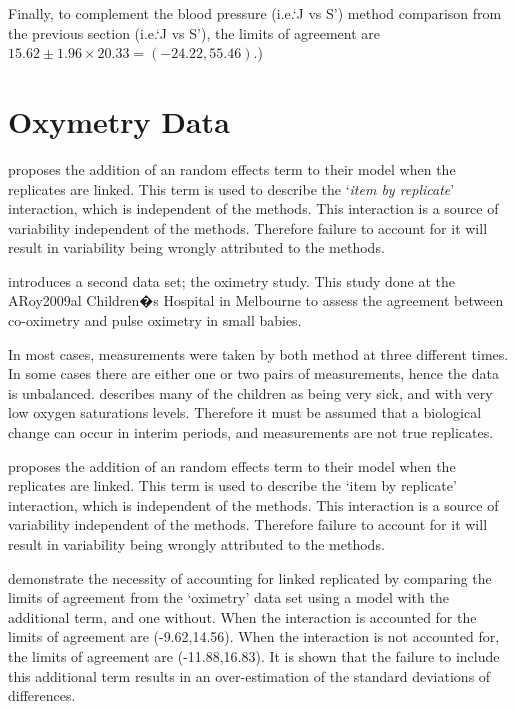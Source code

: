 \documentclass[12pt, a4paper]{report}
\theoremstyle{plain}
\theoremstyle{definition}
\theoremstyle{remark}
\begin{document}
	

	

	
	
	



	
	Finally, to complement the blood pressure (i.e.`J vs S') method comparison from the previous section (i.e.`J vs S'), the limits of agreement are $15.62 \pm 1.96 \times 20.33 = (-24.22, 55.46)$.)
	\newpage	

	\section{Oxymetry Data}
	\citet{BXC2008} proposes the addition of an random effects term to their model when the replicates are linked. This term is used to describe the `\textit{item by replicate}' interaction, which is independent of the methods. This interaction is a source of variability independent of the methods. Therefore failure to account for it will result in variability being wrongly attributed to the methods.
	
	\citet{BXC2008} introduces a second data set; the oximetry study. This study done at the ARoy2009al Children�s Hospital in
	Melbourne to assess the agreement between co-oximetry and pulse oximetry in small babies.
	
	In most cases, measurements were taken by both method at three different times. In some cases there are either one or two pairs of measurements, hence the data is unbalanced. \citet{BXC2008} describes many of the children as being very sick, and with very low oxygen saturations levels. Therefore it must be assumed that a biological change can occur in interim periods, and measurements are not true replicates.
	
	\citet{BXC2008} proposes the addition of an random effects term to their model when the replicates are linked. This term is used to describe the `item by replicate' interaction, which is independent of the methods. This interaction is a source of variability independent of the methods. Therefore failure to account for it will result in variability being wrongly attributed to the methods.
	
	
	\citet{BXC2008} demonstrate the necessity of accounting for linked replicated by comparing the limits of agreement from the `oximetry' data set using a model with the additional term, and one without. When the interaction is accounted for the limits of agreement are (-9.62,14.56). When the interaction is not accounted for, the limits of agreement are (-11.88,16.83). It is shown that the failure to include this additional term results in an over-estimation of the standard deviations of differences.
	
\end{document}
